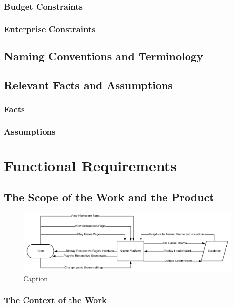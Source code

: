 \documentclass{article}
\begin{document}
\subsubsection{Budget Constraints}
\subsubsection{Enterprise Constraints}
\subsection{Naming Conventions and Terminology}
\subsection{Relevant Facts and Assumptions}
\subsubsection{Facts}
\subsubsection{Assumptions}



\section{Functional Requirements}

\subsection{The Scope of the Work and the Product}

\begin{figure}
    \centering
    \includegraphics{context_diagram.png}
    \caption{Caption}
    \label{fig:my_label}
\end{figure}

\subsubsection{The Context of the Work}
\end{document}
